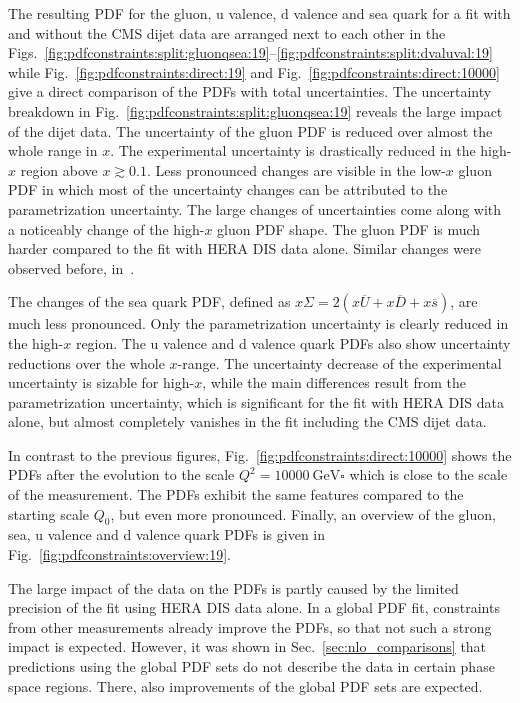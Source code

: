 The resulting PDF for the gluon, u valence, d valence and sea quark for a fit
with and without the CMS dijet data are arranged next to each other in the
Figs.~\ref{fig:pdfconstraints:split:gluonqsea:19}--\ref{fig:pdfconstraints:split:dvaluval:19}
while Fig.~\ref{fig:pdfconstraints:direct:19} and
Fig.~\ref{fig:pdfconstraints:direct:10000} give a direct comparison of the PDFs
with total uncertainties. The uncertainty breakdown in
Fig.~\ref{fig:pdfconstraints:split:gluonqsea:19} reveals the large impact of
the dijet data. The uncertainty of the gluon PDF is reduced over almost the
whole range in $x$. The experimental uncertainty is drastically reduced in the
high-$x$ region above $x \gtrsim 0.1$. Less pronounced changes are visible in
the low-$x$ gluon PDF in which most of the uncertainty changes can be attributed
to the parametrization uncertainty. The large changes of uncertainties come
along with a noticeably change of the high-$x$ gluon PDF shape. The gluon PDF is
much harder compared to the fit with HERA DIS data alone. Similar changes were
observed before, \eg in~\cite{Khachatryan:2014waa}.

The changes of the sea quark PDF, defined as $x\Sigma=2(x\overline U + x
\overline D + x\overline s)$, are much less pronounced.
Only the parametrization uncertainty is clearly reduced in the high-$x$ region.
The u valence and d valence quark PDFs also show uncertainty reductions over
the whole $x$-range. The uncertainty decrease of the experimental uncertainty is
sizable for high-$x$, while the main differences result from the parametrization
uncertainty, which is significant for the fit with HERA DIS data alone, but
almost completely vanishes in the fit including the CMS dijet data.

In contrast to the previous figures, Fig.~\ref{fig:pdfconstraints:direct:10000}
shows the PDFs after the evolution to the scale $Q^2 = \SI{10000}{\GeV \square}$
which is close to the scale of the measurement. The PDFs exhibit the same
features compared to the starting scale $Q_0$, but even more pronounced.
Finally, an overview of the gluon, sea, u valence and d valence quark PDFs is
given in Fig.~\ref{fig:pdfconstraints:overview:19}. 

The large impact of the data on the PDFs is partly caused by the limited
precision of the fit using HERA DIS data alone. In a global PDF fit, constraints
from other measurements already improve the PDFs, so that not such a strong
impact is expected. However, it was shown in Sec.~\ref{sec:nlo_comparisons} that
predictions using the global PDF sets do not describe the data in certain phase
space regions. There, also improvements of the global PDF sets are expected.

